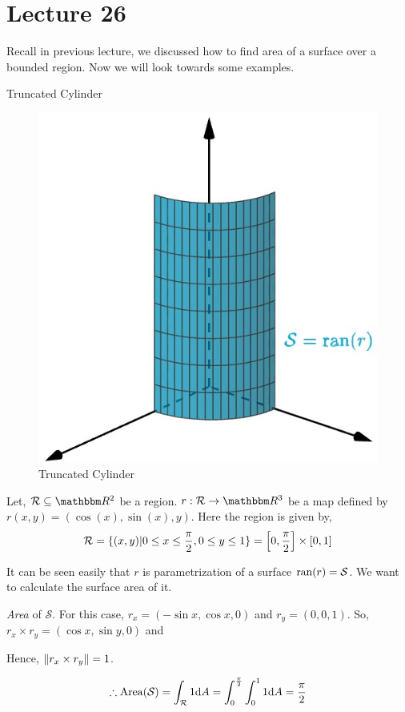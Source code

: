 \documentclass[../Analysis-3]{subfiles}
\begin{document}
\chapter*{Lecture 26} %
\setcounter{chapter}{26} %
\setcounter{section}{0}

Recall in previous lecture, we discussed how to find area of a surface over a bounded region. Now we will look towards some examples.

\begin{Eg}{Truncated Cylinder}{}

    \begin{figure}
        \centering
        \includegraphics[width=.78\linewidth]{../figures/lec-26.1.png}
        \caption{Truncated Cylinder}
    \end{figure}

    Let, $\mathcal{R} \subseteq \R^2$ be a region. $r : \mathcal{R} \to \R^3$ be a map defined by $r(x,y) = (\cos(x),\sin(x),y)$. Here the region is given by,
    \[\mathcal{R} = \{(x,y) | 0 \le x \le \frac{\pi}{2}, 0\le y \le 1\} = \qty[0,\frac{\pi}{2}] \times [0,1] \]

    It can be seen easily that $r$ is parametrization of a surface $\operatorname{ran}(r) = \mathcal{S}$. We want to calculate the surface area of it.

    \textit{Area} of $\mathcal{S}$. For this case, $r_x = (-\sin x, \cos x, 0)$ and $r_y =(0,0,1)$. So, $ r_x \times r_y = (\cos x, \sin y, 0)$ and

    \vspace{0.1cm}

    Hence, $\norm{r_x \times r_y} = 1$.

    \[\therefore \operatorname{Area}(\mathcal{S}) = \int_{\mathcal{R}} 1 \dd A = \int_0^{\frac{\pi}{2}} \int_{0}^1 1 \dd A = \frac{\pi}{2}\]

\end{Eg}
\end{document}
